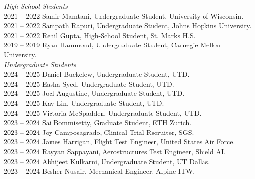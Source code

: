 
\textit{High-School Students} \\
2021 -- 2022 \hspace{28pt} Samir Mamtani, Undergraduate Student, University of Wisconsin. \\
2021 -- 2022 \hspace{28pt} Sampath Rapuri, Undergraduate Student, Johns Hopkins University. \\
2021 -- 2022 \hspace{28pt} Renil Gupta, High-School Student, St. Marks H.S. \\
2019 -- 2019 \hspace{28pt} Ryan Hammond, Undergraduate Student, Carnegie Mellon University. \\

\textit{Undergraduate Students} \\
2024 -- 2025 \hspace{28pt} Daniel Buckelew, Undergraduate Student, UTD. \\
2024 -- 2025 \hspace{28pt} Easha Syed, Undergraduate Student, UTD. \\
2024 -- 2025 \hspace{28pt} Joel Augustine, Undergraduate Student, UTD. \\
2024 -- 2025 \hspace{28pt} Kay Lin, Undergraduate Student, UTD. \\
2024 -- 2025 \hspace{28pt} Victoria McSpadden, Undergraduate Student, UTD. \\
2023 -- 2024 \hspace{28pt} Sai Bommisetty, Graduate Student, ETH Zurich. \\
2023 -- 2024 \hspace{28pt} Joy Camposagrado, Clinical Trial Recruiter, SGS. \\
2023 -- 2024 \hspace{28pt} James Harrigan, Flight Test Engineer, United States Air Force. \\
2023 -- 2024 \hspace{28pt} Rayyan Sappayani, Aerostructures Test Engineer, Shield AI. \\
2023 -- 2024 \hspace{28pt} Abhijeet Kulkarni, Undergraduate Student, UT Dallas. \\
2023 -- 2024 \hspace{28pt} Besher Nusair, Mechanical Engineer, Alpine ITW. \\
